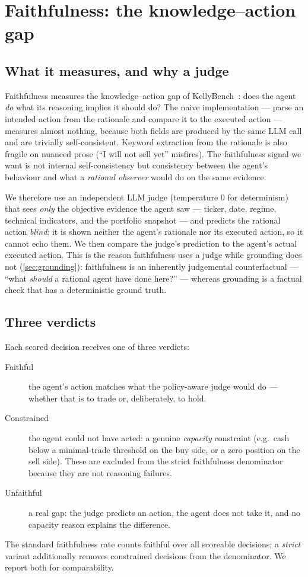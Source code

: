 \section{Faithfulness: the knowledge--action gap}
\label{sec:faithfulness}

\subsection{What it measures, and why a judge}

Faithfulness measures the knowledge--action gap of KellyBench~\cite{kellybench2026}: does the
agent \emph{do} what its reasoning implies it should do? The naive implementation --- parse
an intended action from the rationale and compare it to the executed action --- measures
almost nothing, because both fields are produced by the same LLM call and are trivially
self-consistent. Keyword extraction from the rationale is also fragile on nuanced prose
(``I will not sell yet'' misfires). The faithfulness signal we want is not internal
self-consistency but consistency between the agent's behaviour and what a \emph{rational
observer} would do on the same evidence.

We therefore use an independent LLM judge (temperature $0$ for determinism) that sees
\emph{only} the objective evidence the agent saw --- ticker, date, regime, technical
indicators, and the portfolio snapshot --- and predicts the rational action \emph{blind}: it
is shown neither the agent's rationale nor its executed action, so it cannot echo them. We
then compare the judge's prediction to the agent's actual executed action. This is the
reason faithfulness uses a judge while grounding does not (\cref{sec:grounding}):
faithfulness is an inherently judgemental counterfactual --- ``what \emph{should} a rational
agent have done here?'' --- whereas grounding is a factual check that has a deterministic
ground truth.

\subsection{Three verdicts}

Each scored decision receives one of three verdicts:
\begin{description}
  \item[Faithful] the agent's action matches what the policy-aware judge would do --- whether
  that is to trade or, deliberately, to hold.
  \item[Constrained] the agent could not have acted: a genuine \emph{capacity} constraint
  (e.g.\ cash below a minimal-trade threshold on the buy side, or a zero position on the
  sell side). These are excluded from the strict faithfulness denominator because they are
  not reasoning failures.
  \item[Unfaithful] a real gap: the judge predicts an action, the agent does not take it, and
  no capacity reason explains the difference.
\end{description}
The standard faithfulness rate counts faithful over all scoreable decisions; a
\emph{strict} variant additionally removes constrained decisions from the denominator. We
report both for comparability.

